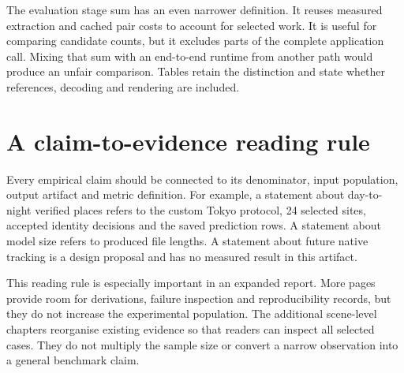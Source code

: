 The evaluation stage sum has an even narrower definition. It reuses measured extraction and cached pair costs to account for selected work. It is useful for comparing candidate counts, but it excludes parts of the complete application call. Mixing that sum with an end-to-end runtime from another path would produce an unfair comparison. Tables retain the distinction and state whether references, decoding and rendering are included.

\section{A claim-to-evidence reading rule}
Every empirical claim should be connected to its denominator, input population, output artifact and metric definition. For example, a statement about day-to-night verified places refers to the custom Tokyo protocol, 24 selected sites, accepted identity decisions and the saved prediction rows. A statement about model size refers to produced file lengths. A statement about future native tracking is a design proposal and has no measured result in this artifact.

This reading rule is especially important in an expanded report. More pages provide room for derivations, failure inspection and reproducibility records, but they do not increase the experimental population. The additional scene-level chapters reorganise existing evidence so that readers can inspect all selected cases. They do not multiply the sample size or convert a narrow observation into a general benchmark claim.
